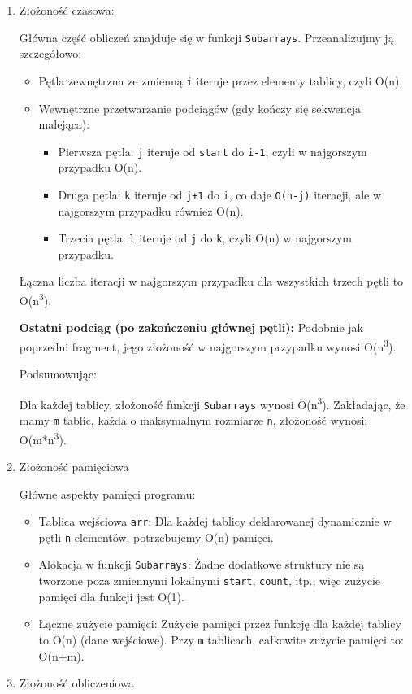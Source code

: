 \documentclass[a4paper,12pt]{article}
\begin{document}
\begin{enumerate}
\item{Złożoność czasowa}:

Główna część obliczeń znajduje się w funkcji \texttt{Subarrays}. Przeanalizujmy ją szczegółowo:
\begin{itemize}
\item{Pętla zewnętrzna ze zmienną \texttt{i} iteruje przez elementy tablicy, czyli O(n).}
\item{Wewnętrzne przetwarzanie podciągów (gdy kończy się sekwencja malejąca):}
\begin{itemize}
\item{Pierwsza pętla: \texttt{j} iteruje od \texttt{start} do \texttt{i-1}, czyli w najgorszym przypadku O(n).}
\item{Druga pętla: \texttt{k} iteruje od \texttt{j+1} do \texttt{i}, co daje \texttt{O(n-j)} iteracji, ale w najgorszym przypadku również O(n).}
\item{Trzecia pętla: \texttt{l} iteruje od \texttt{j} do \texttt{k}, czyli O(n) w najgorszym przypadku.}
\end{itemize}
\end{itemize}
Łączna liczba iteracji w najgorszym przypadku dla wszystkich trzech pętli to O(n\textsuperscript{3}).

\textbf{Ostatni podciąg (po zakończeniu głównej pętli):} Podobnie jak poprzedni fragment, jego złożoność w najgorszym przypadku wynosi O(n\textsuperscript{3}).

Podsumowując:

Dla każdej tablicy, złożoność funkcji \texttt{Subarrays} wynosi O(n\textsuperscript{3}). Zakładając, że mamy \texttt{m} tablic, każda o maksymalnym rozmiarze \texttt{n}, złożoność wynosi: O(m*n\textsuperscript{3}).

\item{Złożoność pamięciowa}

Główne aspekty pamięci programu:
\begin{itemize}
\item{Tablica wejściowa \texttt{arr}: Dla każdej tablicy deklarowanej dynamicznie w pętli \texttt{n} elementów, potrzebujemy O(n) pamięci.}
\item{Alokacja w funkcji \texttt{Subarrays}: Żadne dodatkowe struktury nie są tworzone poza zmiennymi lokalnymi \texttt{start}, \texttt{count}, itp., więc zużycie pamięci dla funkcji jest O(1).}
\item{Łączne zużycie pamięci: Zużycie pamięci przez funkcję dla każdej tablicy to O(n) (dane wejściowe). Przy \texttt{m} tablicach, całkowite zużycie pamięci to: O(n+m).}
\end{itemize}
\item{Złożoność obliczeniowa}


\end{enumerate}
\end{document}
